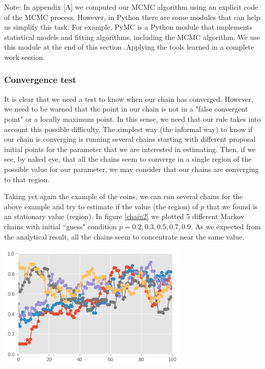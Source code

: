 \documentclass[onecolumn,           %
               showpacs,            %
               preprintnumbers,     %
               aps,                 %
               prl,          	    %
               letterpaper,             %
               superscriptaddress,      %
               nofootinbib,         %
               tightenlines,        %
               floats,floatfix      %
               ,usenatbib,
               ]{revtex4-1}
\begin{document}
Note: In appendix [A] we computed our MCMC algorithm using an explicit code of the MCMC process. However, in Python there are some modules that can help us simplify this task. For example, PyMC is a Python module that implements statistical models and fitting algorithms, including the MCMC algorithm. We use this module at the end of this section .Applying the tools learned in a complete work session.

\subsubsection{Convergence test} 
It is clear that we need a test to know when our chain has converged. However, we need to be warned that the point in our chain is not in a "false convergent point" or a locally maximum point. In this sense, we need that our rule takes into account this possible difficulty. The simplest way (the informal way) to know if our chain is converging is running several chains starting with different proposal initial points for the parameter that we are interested in estimating. Then, if we see, by naked eye, that all the chains seem to converge in a single region of the possible value for our parameter, we may consider that our chains are converging to that region. 

 Taking yet again the example of the coins, we can run several chains for the above example and try to estimate if the value (the region) of $p$ that we found is an stationary value (region). In figure \ref{chain2} we plotted 5 different Markov chains with initial ``guess" condition $p=0.2,0.3,0.5,0.7,0.9$. As we expected from the analytical result, all the chains seem to concentrate near the same value.

\begin{minipage}{\textwidth}
\centering
\includegraphics[height=6cm]{Figures/chain22.png}
\label{chain2}
\end{minipage}
\end{document}
